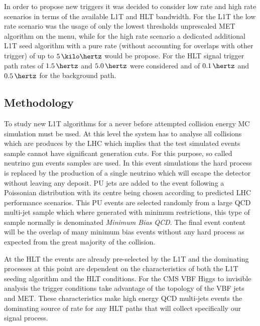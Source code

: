 In order to propose new triggers it was decided to consider low rate and high rate scenarios in terms of the available \gls{L1T} and \gls{HLT} bandwidth. For the \gls{L1T} the low rate scenario was the usage of only the lowest thresholds unprescaled \gls{MET} algorithm on the menu, while for the high rate scenario a dedicated additional \gls{L1T} seed algorithm with a pure rate (without accounting for overlaps with other trigger) of up to $5\,\kilo\hertz$ would be propose. For the \gls{HLT} signal trigger path rates of $1.5\,\hertz$ and $5.0\,\hertz$ were considered and of $0.1\,\hertz$ and $0.5\,\hertz$ for the background path.

\subsection{Methodology}
\label{SECTION:RunIITriggerStudies_Methodology}


To study new \gls{L1T} algorithms for a never before attempted collision energy \gls{MC} simulation must be used. At this level the system has to analyse all collisions which are produces by the \gls{LHC} which implies that the test simulated events sample cannot have significant generation cuts. For this purpose, so called neutrino gun events samples are used. In this event simulations the hard process is replaced by the production of a single neutrino which will escape the detector without leaving any deposit. \acrfull{PU} jets are added to the event following a Poissonian distribution with its centre being chosen according to predicted \gls{LHC} performance scenarios. This \gls{PU} events are selected randomly from a large \gls{QCD} multi-jet sample which where generated with minimum restrictions, this type of sample normally is denominated \textit{Minimum Bias \gls{QCD}}. The final event content will be the overlap of many minimum bias events without any hard process as expected from the great majority of the collision.

At the \gls{HLT} the events are already pre-selected by the \gls{L1T} and the dominating processes at this point are dependent on the characteristics of both the \gls{L1T} seeding algorithm and the \gls{HLT} conditions. For the \gls{CMS} \gls{VBF} Higgs to invisible analysis the trigger conditions take advantage of the topology of the \gls{VBF} jets and \gls{MET}. These characteristics make high energy \gls{QCD} multi-jets events the dominating source of rate for any \gls{HLT} paths that will collect specifically our signal process.

